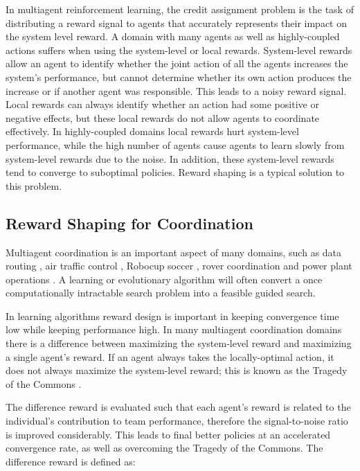\documentclass[onehalf,11pt]{beavtex}
\begin{document}
In multiagent reinforcement learning, the credit assignment problem is the task of distributing a reward signal to agents that accurately represents their impact on the system level reward. A domain with many agents as well as highly-coupled actions suffers when using the system-level or local rewards. System-level rewards allow an agent to identify whether the joint action of all the agents increases the system's performance, but cannot determine whether its own action produces the increase or if another agent was responsible. This leads to a noisy reward signal. Local rewards can always identify whether an action had some positive or negative effects, but these local rewards do not allow agents to coordinate effectively. In highly-coupled domains local rewards hurt system-level performance, while the high number of agents cause agents to learn slowly from system-level rewards due to the noise. In addition, these system-level rewards tend to converge to suboptimal policies. Reward shaping is a typical solution to this problem.

\subsection{Reward Shaping for Coordination}

Multiagent coordination is an important aspect of many domains, such as data routing \cite{tumer-wolpert_jair02}, air traffic control \cite{tumer-agogino_jaamas12, Sislak:2008:AMA:1402744.1402755}, Robocup soccer \cite{AAMAS12-agmon}, rover coordination \cite{5509316} and power plant operations \cite{Colby:2012:SFF:2343576.2343637}. A learning or evolutionary algorithm will often convert a once computationally intractable search problem into a feasible guided search. 

In learning algorithms reward design is important in keeping convergence time low while keeping performance high. In many multiagent coordination domains there is a difference between maximizing the system-level reward and maximizing a single agent's reward. If an agent always takes the locally-optimal action, it does not always maximize the system-level reward; this is known as the Tragedy of the Commons \cite{Hardin}.

The difference reward \cite{tumer-wolpert_jair02} is evaluated such that each agent's reward is related to the individual's contribution to team performance, therefore the signal-to-noise ratio is improved considerably. This leads to final better policies at an accelerated convergence rate, as well as overcoming the Tragedy of the Commons. The difference reward is defined as:
\end{document}
